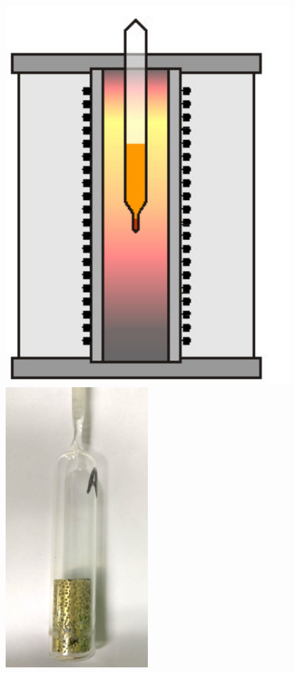 \documentclass[usenames,dvipsnames]{beamer}
\begin{document}
\begin{frame}

\begin{columns}
\includegraphics[width=0.8\textwidth]{img/tamgrano/brigdman.jpg}
\includegraphics[width=0.4\textwidth]{img/tamgrano/EspCuarzo.jpg}

\end{columns}
\end{frame}
\end{document}
